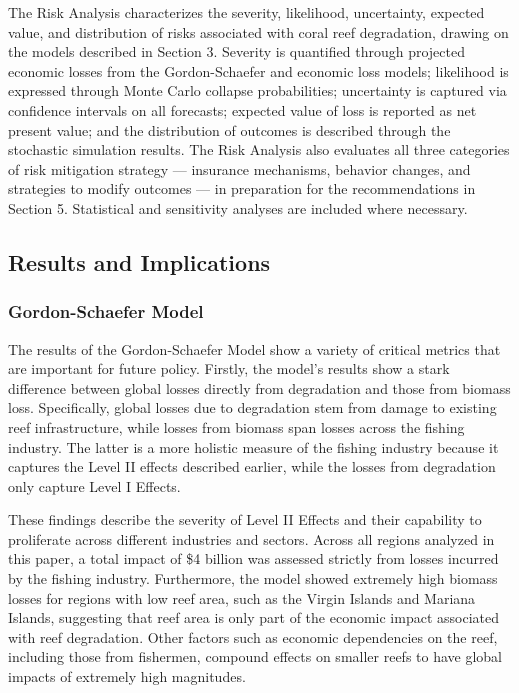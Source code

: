 \documentclass[10pt,letterpaper]{article}
\newcounter{metric}
\newcounter{gs}
\begin{document}
The Risk Analysis characterizes the severity, likelihood, uncertainty, expected value, and distribution
of risks associated with coral reef degradation, drawing on the models described in Section 3. Severity is
quantified through projected economic losses from the Gordon-Schaefer and economic loss models; likelihood
is expressed through Monte Carlo collapse probabilities; uncertainty is captured via confidence intervals on
all forecasts; expected value of loss is reported as net present value; and the distribution of outcomes is
described through the stochastic simulation results. The Risk Analysis also evaluates all three categories of
risk mitigation strategy — insurance mechanisms, behavior changes, and strategies to modify outcomes —
in preparation for the recommendations in Section 5. Statistical and sensitivity analyses are included where
necessary.

\subsection{Results and Implications}

\subsubsection{Gordon-Schaefer Model}
The results of the Gordon-Schaefer Model show a variety of critical metrics that are important for future policy. Firstly, the model's results show a stark difference between global losses directly from degradation and those from biomass loss. Specifically, global losses due to degradation stem from damage to existing reef infrastructure, while losses from biomass span losses across the fishing industry. The latter is a more holistic measure of the fishing industry because it captures the Level II effects described earlier, while the losses from degradation only capture Level I Effects. 

These findings describe the severity of Level II Effects and their capability to proliferate across different industries and sectors. Across all regions analyzed in this paper, a total impact of \$4 billion was assessed strictly from losses incurred by the fishing industry. Furthermore, the model showed extremely high biomass losses for regions with low reef area, such as the Virgin Islands and Mariana Islands, suggesting that reef area is only part of the economic impact associated with reef degradation. Other factors such as economic dependencies on the reef, including those from fishermen, compound effects on smaller reefs to have global impacts of extremely high magnitudes.
\end{document}
